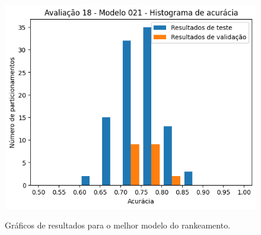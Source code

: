 \begin{figure}[h]
{    \includegraphics[scale=0.5]{images/histograma_resultados_melhor_modelo.png}
    \label{fig:best_results_histogram}
  }
	\caption{Gráficos de resultados para o melhor modelo do rankeamento.}
	\label{fig:best_results_plot}
\end{figure}


